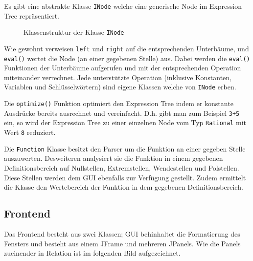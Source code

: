 \documentclass[12pt]{article}
\begin{document}
	Es gibt eine abstrakte Klasse \texttt{INode} welche eine generische Node im Expression Tree repräsentiert.
	\begin{figure}[h!]
		\begin{center}
		\end{center}
		\caption{Klassenstruktur der Klasse \texttt{INode}}
	\end{figure}
	Wie gewohnt verweisen \texttt{left} und \texttt{right} auf die entsprechenden Unterbäume, und \texttt{eval()} wertet die Node (an einer gegebenen Stelle) aus.
	Dabei werden die \texttt{eval()} Funktionen der Unterbäume aufgerufen und mit der entsprechenden Operation miteinander verrechnet. 
	Jede unterstützte Operation (inklusive Konstanten, Variablen und Schlüsselwörtern) sind eigene Klassen welche von \texttt{INode} erben.

	Die \texttt{optimize()} Funktion optimiert den Expression Tree indem er konstante Ausdrücke bereits ausrechnet und vereinfacht. D.h. gibt man zum Beispiel \texttt{3+5} ein, so wird
	der Expression Tree zu einer einzelnen Node vom Typ \texttt{Rational} mit Wert \texttt{8} reduziert.

	Die \texttt{Function} Klasse besitzt den Parser um die Funktion an einer gegeben Stelle auszuwerten. Desweiteren analysiert sie die Funktion in einem
	gegebenen Definitionsbereich auf Nullstellen, Extremstellen, Wendestellen und Polstellen. Diese Stellen werden dem GUI ebenfalls
	zur Verfügung gestellt. Zudem ermittelt die Klasse den Wertebereich der Funktion in dem gegebenen Definitionsbereich.

	\subsection*{Frontend}
	Das Frontend besteht aus zwei Klassen; GUI behinhaltet die Formatierung des Fensters und besteht aus einem JFrame und mehreren JPanels.
	Wie die Panels zueinender in Relation ist im folgenden Bild aufgezeichnet.
\end{document}
